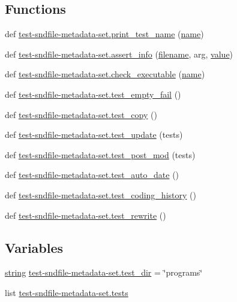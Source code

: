 \subsection*{Functions}
\begin{DoxyCompactItemize}
\item 
def \hyperlink{namespacetest-sndfile-metadata-set_a7eadfb659f8e3c097dcb1bbc6525dd4d}{test-\/sndfile-\/metadata-\/set.\+print\+\_\+test\+\_\+name} (\hyperlink{lib_2expat_8h_a1b49b495b59f9e73205b69ad1a2965b0}{name})
\item 
def \hyperlink{namespacetest-sndfile-metadata-set_abefa70f56c40e200ac92181b4803eb0d}{test-\/sndfile-\/metadata-\/set.\+assert\+\_\+info} (\hyperlink{test__portburn_8cpp_a7efa5e9c7494c7d4586359300221aa5d}{filename}, arg, \hyperlink{lib_2expat_8h_a4a30a13b813682e68c5b689b45c65971}{value})
\item 
def \hyperlink{namespacetest-sndfile-metadata-set_a99fe025bd268b2d3cb998aa494a215cf}{test-\/sndfile-\/metadata-\/set.\+check\+\_\+executable} (\hyperlink{lib_2expat_8h_a1b49b495b59f9e73205b69ad1a2965b0}{name})
\item 
def \hyperlink{namespacetest-sndfile-metadata-set_a3d44335479debf56f464776dad748c9f}{test-\/sndfile-\/metadata-\/set.\+test\+\_\+empty\+\_\+fail} ()
\item 
def \hyperlink{namespacetest-sndfile-metadata-set_a29492aa8e7f34f4dfd7e642dda118820}{test-\/sndfile-\/metadata-\/set.\+test\+\_\+copy} ()
\item 
def \hyperlink{namespacetest-sndfile-metadata-set_abfdd2d424cc78efe1fcf3c25d08eb356}{test-\/sndfile-\/metadata-\/set.\+test\+\_\+update} (tests)
\item 
def \hyperlink{namespacetest-sndfile-metadata-set_a4b2a8d646bff7348935a8a90a9e190cf}{test-\/sndfile-\/metadata-\/set.\+test\+\_\+post\+\_\+mod} (tests)
\item 
def \hyperlink{namespacetest-sndfile-metadata-set_adfa6dc8e4c9ea6b5b2cde5215121747e}{test-\/sndfile-\/metadata-\/set.\+test\+\_\+auto\+\_\+date} ()
\item 
def \hyperlink{namespacetest-sndfile-metadata-set_a53b65e1ac10aaf8504cbf832ee982461}{test-\/sndfile-\/metadata-\/set.\+test\+\_\+coding\+\_\+history} ()
\item 
def \hyperlink{namespacetest-sndfile-metadata-set_a2720cc7879f0c1b9c41d89607f4ba0d5}{test-\/sndfile-\/metadata-\/set.\+test\+\_\+rewrite} ()
\end{DoxyCompactItemize}
\subsection*{Variables}
\begin{DoxyCompactItemize}
\item 
\hyperlink{test__lib_f_l_a_c_2format_8c_ab02026ad0de9fb6c1b4233deb0a00c75}{string} \hyperlink{namespacetest-sndfile-metadata-set_ab86c49508853fc70e1cb07500b8df69a}{test-\/sndfile-\/metadata-\/set.\+test\+\_\+dir} = \char`\"{}programs\char`\"{}
\item 
list \hyperlink{namespacetest-sndfile-metadata-set_ab9f1387ea8f216c0c1dad3169d984274}{test-\/sndfile-\/metadata-\/set.\+tests}
\end{DoxyCompactItemize}
